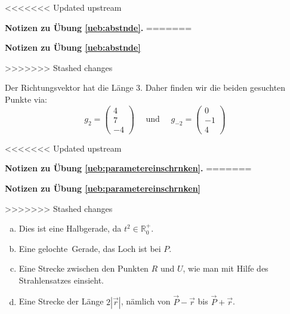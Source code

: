 \documentclass[%
11pt,%
twoside,%
titlepage,%
<<<<<<< Updated upstream
german,%
=======
swissgerman,%
>>>>>>> Stashed changes
headsepline%
]{scrartcl}
\newcommand{\faReturnGray}{\textcolor{gray}{\faMailReply}} %
\theoremstyle{definition}
\theoremstyle{plain}
\newcommand{\concatueb}[1]{ueb:#1}%
\newcommand{\concatlsg}[1]{lsg:#1}%
\newenvironment{lsg}[1]{%
<<<<<<< Updated upstream
    \par\noindent\textbf{Notizen zu Übung \ref{\concatueb{#1}}.}%
    \label{\concatlsg{#1}}
=======
    \par\noindent\textbf{Notizen zu Übung \ref{\concatueb{#1}}}\label{\concatlsg{#1}}
    \hfill\hyperref[\concatueb{#1}]{\faReturnGray}\par %
>>>>>>> Stashed changes
}{%
    \par%
}
\begin{document}
\begin{lsg}{abstnde}
Der Richtungsvektor hat die Länge $3$. Daher finden wir die beiden gesuchten Punkte via:
$$g_2=\begin{pmatrix}4\\7\\-4\end{pmatrix}\quad\text{ und }\quad g_{-2}=\begin{pmatrix}0\\-1\\4\end{pmatrix}$$
\end{lsg}
\begin{lsg}{parametereinschrnken}
\begin{enumerate}[a)]
    \item Dies ist eine Halbgerade, da $t^2\in\mathbb{R}^+_0$.
    \item Eine \glqq gelochte\grqq\ Gerade, das Loch ist bei $P$.
    \item Eine Strecke zwischen den Punkten $R$ und $U$, wie man mit Hilfe des Strahlensatzes einsieht.
    \item Eine Strecke der Länge $2|\vec{r}|$, nämlich von $\vec{P}-\vec{r}$ bis $\vec{P}+\vec{r}$.
\end{enumerate}
\end{lsg}
\end{document}
